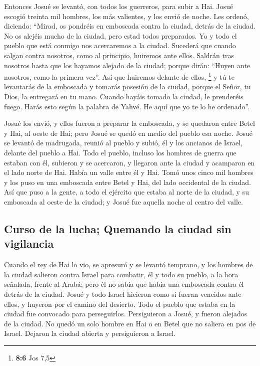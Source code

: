  Entonces Josué se levantó, con todos los guerreros, para
subir a Hai. Josué escogió treinta mil hombres, los más valientes, y los
envió de noche.  Les ordenó, diciendo: ``Mirad, os
pondréis en emboscada contra la ciudad, detrás de la ciudad. No os
alejéis mucho de la ciudad, pero estad todos preparados. 
Yo y todo el pueblo que está conmigo nos acercaremos a la ciudad.
Sucederá que cuando salgan contra nosotros, como al principio, huiremos
ante ellos.  Saldrán tras nosotros hasta que los hayamos
alejado de la ciudad; porque dirán: ``Huyen ante nosotros, como la
primera vez''. Así que huiremos delante de ellos, \footnote{\textbf{8:6}
  Jos 7,5}  y tú te levantarás de la emboscada y tomarás
posesión de la ciudad, porque el Señor, tu Dios, la entregará en tu
mano.  Cuando hayáis tomado la ciudad, le prenderéis
fuego. Harás esto según la palabra de Yahvé. He aquí que yo te lo he
ordenado''.

 Josué los envió, y ellos fueron a preparar la emboscada,
y se quedaron entre Betel y Hai, al oeste de Hai; pero Josué se quedó en
medio del pueblo esa noche.  Josué se levantó de
madrugada, reunió al pueblo y subió, él y los ancianos de Israel,
delante del pueblo a Hai.  Todo el pueblo, incluso los
hombres de guerra que estaban con él, subieron y se acercaron, y
llegaron ante la ciudad y acamparon en el lado norte de Hai. Había un
valle entre él y Hai.  Tomó unos cinco mil hombres y los
puso en una emboscada entre Betel y Hai, del lado occidental de la
ciudad.  Así que puso a la gente, a todo el ejército que
estaba al norte de la ciudad, y su emboscada al oeste de la ciudad; y
Josué fue aquella noche al centro del valle.

\hypertarget{curso-de-la-lucha-quemando-la-ciudad-sin-vigilancia}{%
\subsection{Curso de la lucha; Quemando la ciudad sin
vigilancia}\label{curso-de-la-lucha-quemando-la-ciudad-sin-vigilancia}}

 Cuando el rey de Hai lo vio, se apresuró y se levantó
temprano, y los hombres de la ciudad salieron contra Israel para
combatir, él y todo su pueblo, a la hora señalada, frente al Arabá; pero
él no sabía que había una emboscada contra él detrás de la ciudad.
 Josué y todo Israel hicieron como si fueran vencidos
ante ellos, y huyeron por el camino del desierto.  Todo
el pueblo que estaba en la ciudad fue convocado para perseguirlos.
Persiguieron a Josué, y fueron alejados de la ciudad.  No
quedó un solo hombre en Hai o en Betel que no saliera en pos de Israel.
Dejaron la ciudad abierta y persiguieron a Israel.

